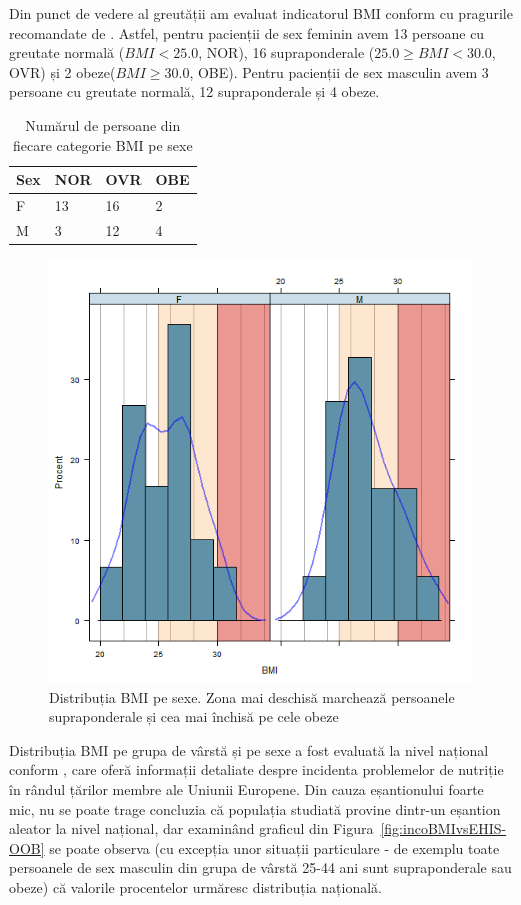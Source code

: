 \documentclass[12pt]{article}
\begin{document}
  Din punct de vedere al greutății am evaluat indicatorul \ac{BMI} conform cu pragurile recomandate de \citep{whobmi06}. 
  Astfel, pentru pacienții de sex feminin avem 13 persoane cu greutate normală ($BMI<25.0$, NOR), 16 supraponderale ($25.0 \geq BMI <30.0$, OVR) și 2 obeze($BMI \geq 30.0$, OBE). 
  Pentru pacienții de sex masculin avem 3 persoane cu greutate normală, 12 supraponderale și 4 obeze.   
  \begin{table}[H]
   \centering
   \begin{tabular}{ |l|l|l|l| }
    \hline
    Sex & NOR & OVR & OBE \\ \hline
    F & 13 & 16 & 2 \\ \hline
    M & 3 &  12 & 4 \\ \hline
   \end{tabular}
   \caption{Numărul de persoane din fiecare categorie \ac{BMI} pe sexe}
   \label{tab:BMIgSex}
  \end{table}
  \begin{figure}[H]
    \centering
    \includegraphics[width=0.8\linewidth]{incobmiDens}
    \caption{Distribuția \ac{BMI} pe sexe. Zona mai deschisă marchează persoanele supraponderale și cea mai închisă pe cele obeze}
    \label{fig:incobmiDens}
  \end{figure}
  Distribuția \ac{BMI} pe grupa de vârstă și pe sexe a fost evaluată la nivel național conform \citep{EHIS09}, care oferă informații detaliate despre incidenta problemelor de nutriție în rândul țărilor membre ale Uniunii Europene. 
  Din cauza eșantionului foarte mic, nu se poate trage concluzia că populația studiată provine dintr-un eșantion aleator la nivel național, dar examinând graficul din Figura~\ref{fig:incoBMIvsEHIS-OOB} se poate observa (cu excepția unor situații particulare - de exemplu toate persoanele de sex masculin din grupa de vârstă 25-44 ani sunt supraponderale sau obeze) că valorile procentelor urmăresc distribuția națională.
\end{document}

